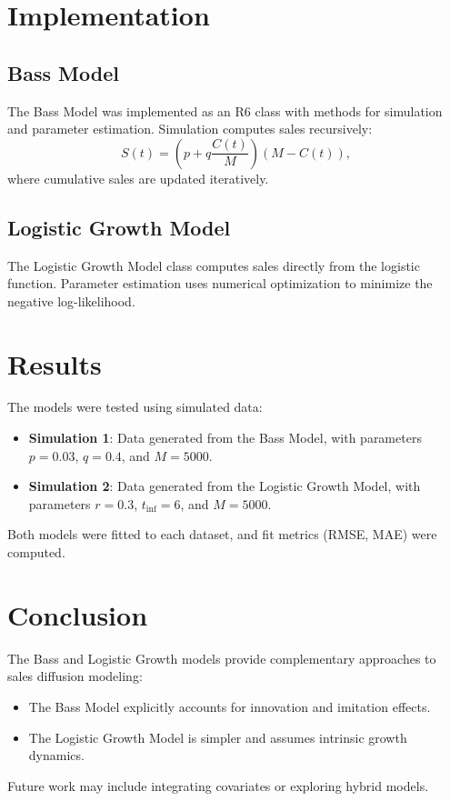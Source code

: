\documentclass[12pt]{article}
\begin{document}
\section{Implementation}
\subsection{Bass Model}
The Bass Model was implemented as an R6 class with methods for simulation and parameter estimation. Simulation computes sales recursively:
\[
S(t) = \left( p + q \frac{C(t)}{M} \right) \left( M - C(t) \right),
\]
where cumulative sales are updated iteratively.

\subsection{Logistic Growth Model}
The Logistic Growth Model class computes sales directly from the logistic function. Parameter estimation uses numerical optimization to minimize the negative log-likelihood.

\section{Results}
The models were tested using simulated data:
\begin{itemize}
    \item \textbf{Simulation 1}: Data generated from the Bass Model, with parameters \(p = 0.03\), \(q = 0.4\), and \(M = 5000\).
    \item \textbf{Simulation 2}: Data generated from the Logistic Growth Model, with parameters \(r = 0.3\), \(t_{\text{inf}} = 6\), and \(M = 5000\).
\end{itemize}
Both models were fitted to each dataset, and fit metrics (RMSE, MAE) were computed.

\section{Conclusion}
The Bass and Logistic Growth models provide complementary approaches to sales diffusion modeling:
\begin{itemize}
    \item The Bass Model explicitly accounts for innovation and imitation effects.
    \item The Logistic Growth Model is simpler and assumes intrinsic growth dynamics.
\end{itemize}
Future work may include integrating covariates or exploring hybrid models.
\end{document}
